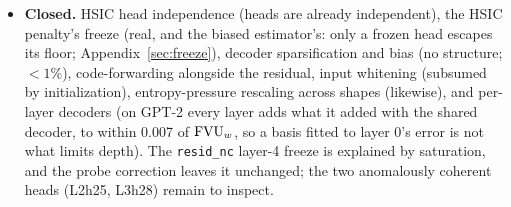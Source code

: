 \begin{itemize}
(2a+3) is now trained, as \texttt{m5120\_g160top1\_p5} ($\fvu$ 0.294), for
the modularity control above, but is not yet on the ladder. Still to run:
the one-layer variants at $m{=}11264$, the mid-range $\topk$ sweep
($k_{\mathrm{SAE}} \in \{512, 2048\}$), and random-support and
nonnegative-LS refit controls, the second being the positivity-constrained
refit of Gao et al.~\cite{gao2024}.
\item \textbf{Closed.} HSIC head independence (heads are already
independent), the HSIC penalty's freeze (real, and the biased
estimator's: only a frozen head escapes its floor;
Appendix~\ref{sec:freeze}), decoder sparsification and bias (no
structure; $<1\%$),
code-forwarding alongside the residual, input whitening (subsumed by
initialization), entropy-pressure rescaling across shapes (likewise), and
per-layer decoders (on GPT-2 every layer adds what it added with the
shared decoder, to within 0.007 of $\fvu$, so a basis fitted to layer 0's
error is not what limits depth). The \texttt{resid\_nc} layer-4 freeze is
explained by saturation, and the probe correction leaves it unchanged;
the two anomalously coherent heads (L2h25, L3h28) remain to inspect.
\end{itemize}
